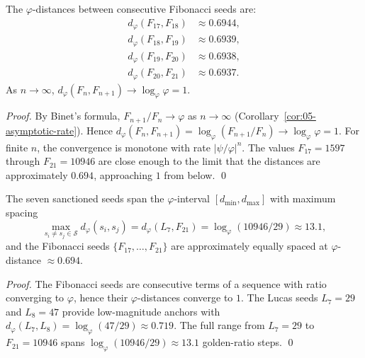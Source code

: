 \begin{lemma}
\label{fa_05:lem:seed-distances}
The $\varphi$-distances between consecutive Fibonacci seeds are:
\begin{align*}
  d_{\varphi}(F_{17}, F_{18}) &\approx 0.6944, \\
  d_{\varphi}(F_{18}, F_{19}) &\approx 0.6939, \\
  d_{\varphi}(F_{19}, F_{20}) &\approx 0.6938, \\
  d_{\varphi}(F_{20}, F_{21}) &\approx 0.6937.
\end{align*}
As $n \to \infty$, $d_{\varphi}(F_{n}, F_{n+1}) \to
\log_{\varphi}\varphi = 1$.
\end{lemma}

\begin{proof}
By Binet's formula, $F_{n+1}/F_{n} \to \varphi$ as $n \to \infty$
(Corollary~\ref{cor:05-asymptotic-rate}). Hence
$d_{\varphi}(F_{n}, F_{n+1}) = \log_{\varphi}(F_{n+1}/F_{n}) \to
\log_{\varphi} \varphi = 1$. For finite $n$, the convergence is
monotone with rate $|\psi/\varphi|^{n}$. The values
$F_{17} = 1597$ through $F_{21} = 10946$ are close enough to the
limit that the distances are approximately $0.694$, approaching $1$
from below.
\qed
\end{proof}

\begin{theorem}
\label{fa_05:thm:seed-uniformity}
The seven sanctioned seeds span the $\varphi$-interval $[d_{\min},
d_{\max}]$ with maximum spacing
\[
  \max_{s_{i} \ne s_{j} \in \mathcal{S}} d_{\varphi}(s_{i}, s_{j})
  = d_{\varphi}(L_{7}, F_{21}) = \log_{\varphi}(10946/29) \approx
  13.1,
\]
and the Fibonacci seeds $\{F_{17}, \ldots, F_{21}\}$ are
approximately equally spaced at $\varphi$-distance $\approx 0.694$.
\end{theorem}

\begin{proof}
The Fibonacci seeds are consecutive terms of a sequence with ratio
converging to $\varphi$, hence their $\varphi$-distances converge to
$1$. The Lucas seeds $L_{7} = 29$ and $L_{8} = 47$ provide
low-magnitude anchors with
$d_{\varphi}(L_{7}, L_{8}) = \log_{\varphi}(47/29) \approx 0.719$.
The full range from $L_{7} = 29$ to $F_{21} = 10946$ spans
$\log_{\varphi}(10946/29) \approx 13.1$ golden-ratio steps.
\qed
\end{proof}

